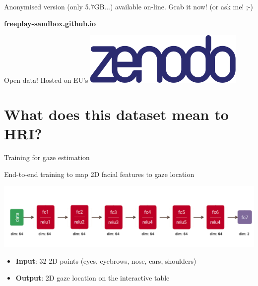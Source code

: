 \documentclass[compress]{beamer}
\begin{document}
\begin{frame}[plain]
    \Large
    \begin{center}
        Anonymised version (only 5.7GB...) available on-line. Grab it now!
        (or ask me! ;-)

        \LARGE \href{https://freeplay-sandbox.github.io}{\bf freeplay-sandbox.github.io}

        \vspace{3cm}
            \large Open data! Hosted on EU's  \includegraphics[width=0.3\linewidth]{zenodo}
    \end{center}
\end{frame}








\section[For HRI?]{What does this dataset mean to HRI?}


\begin{frame}{Training for gaze estimation}

    \Large End-to-end training to map 2D facial features to gaze location

    \begin{center}
        \includegraphics[width=0.9\linewidth]{nn-gaze-estimation}
    \end{center}

    \begin{itemize}
        \item \textbf{Input}: 32 2D points (eyes, eyebrows, nose, ears,
            shoulders)
        \item \textbf{Output}: 2D gaze location on the interactive table
    \end{itemize}
\end{frame}
\end{document}
